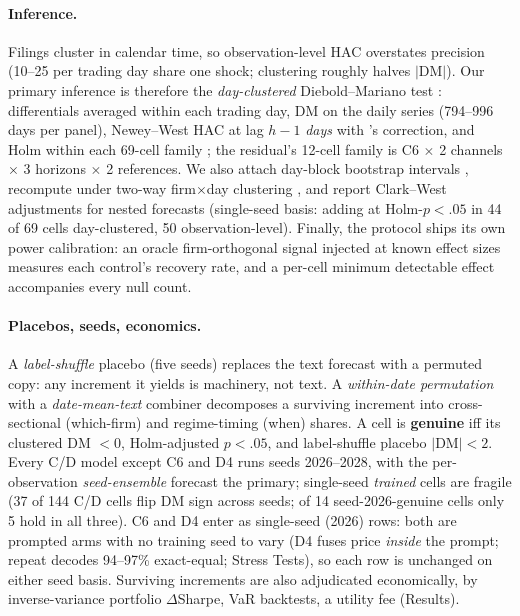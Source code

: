 \paragraph{Inference.}
Filings cluster in calendar time, so observation-level HAC overstates precision (10--25 per trading day share one shock; clustering roughly halves $|\mathrm{DM}|$). Our primary inference is therefore the \emph{day-clustered} Diebold--Mariano test \citep{diebold1995comparing}: differentials averaged within each trading day, DM on the daily series (794--996 days per panel), Newey--West HAC at lag $h-1$ \emph{days} with \citet{harvey1997testing}'s correction, and Holm within each 69-cell family \citep{holm1979simple}; the residual's 12-cell family is C6 $\times$ 2 channels $\times$ 3 horizons $\times$ 2 references. We also attach day-block bootstrap intervals \citep{politis1994stationary}, recompute under two-way firm$\times$day clustering \citep{cameron2011twoway}, and report Clark--West adjustments for nested forecasts \citep{clarkwest2007} (single-seed basis: adding at Holm-$p<.05$ in 44 of 69 cells day-clustered, 50 observation-level). Finally, the protocol ships its own power calibration: an oracle firm-orthogonal signal injected at known effect sizes measures each control's recovery rate, and a per-cell minimum detectable effect accompanies every null count.

\paragraph{Placebos, seeds, economics.}
A \emph{label-shuffle} placebo (five seeds) replaces the text forecast with a permuted copy: any increment it yields is machinery, not text. A \emph{within-date permutation} with a \emph{date-mean-text} combiner decomposes a surviving increment into cross-sectional (which-firm) and regime-timing (when) shares. A cell is \textbf{genuine} iff its clustered DM $<0$, Holm-adjusted $p<.05$, and label-shuffle placebo $|\mathrm{DM}|<2$. Every C/D model except C6 and D4 runs seeds 2026--2028, with the per-observation \emph{seed-ensemble} forecast the primary; single-seed \emph{trained} cells are fragile (37 of 144 C/D cells flip DM sign across seeds; of 14 seed-2026-genuine cells only 5 hold in all three). C6 and D4 enter as single-seed (2026) rows: both are prompted arms with no training seed to vary (D4 fuses price \emph{inside} the prompt; repeat decodes 94--97\% exact-equal; Stress Tests), so each row is unchanged on either seed basis. Surviving increments are also adjudicated economically, by inverse-variance portfolio $\Delta$Sharpe, VaR backtests, a utility fee (Results).
